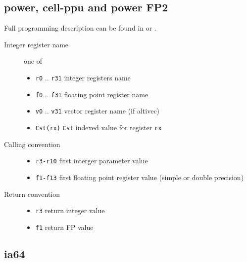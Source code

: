 \documentclass{article}
\begin{document}
\subsection{power, cell-ppu  and power FP2}

Full programming description can be found in \cite{POWERABI1} or
\cite{POWERABI2}.

\begin{description}
\item[Integer register name]  one of
  \begin{itemize}
  \item \verb|r0| .. \verb|r31| integer registers name
  \item \verb|f0| .. \verb|f31| floating point register name
  \item \verb|v0| .. \verb|v31| vector register name (if altivec)
  \item \verb|Cst(rx)| \texttt{Cst} indexed value for register \texttt{rx}
  \end{itemize}
\item[Calling convention] 
  \begin{itemize}
  \item \verb|r3-r10| first interger parameter value
  \item \verb|f1-f13| first floating point register value (simple or double precision)
  \end{itemize}
\item[Return convention] 
  \begin{itemize}
  \item \verb|r3| return integer value
  \item \verb|f1| return FP value
  \end{itemize}

\end{description}

\subsection{ia64}
\end{document}
